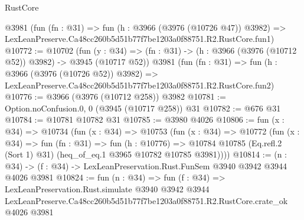 \begin{lexlean}{RustCore}
\begin{coremodule}
    @3981
    (fun (fn : @31) =>
    fun (h : @3966 (@3976 (@10726 @47)) @3982) =>
    LexLeanPreserve.Ca48cc260b5d51b77f7be1203a0f88751.R2.RustCore.fun1)
@10772 := @10702
    (fun (y : @34) => (fn : @31) -> (h : @3966 (@3976 (@10712 @52)) @3982) -> @3945 (@10717 @52))
    @3981
    (fun (fn : @31) =>
    fun (h : @3966 (@3976 (@10726 @52)) @3982) =>
    LexLeanPreserve.Ca48cc260b5d51b77f7be1203a0f88751.R2.RustCore.fun2)
@10776 := @3966 (@3976 (@10712 @258)) @3982
@10781 := Option.noConfusion.{0, 0} (@3945 (@10717 @258)) @31
@10782 := @676 @31
@10784 := @10781 @10782 @31
@10785 := @3980 @4026
@10806 := fun (x : @34) =>
  @10734
    (fun (x : @34) =>
    @10753
      (fun (x : @34) =>
      @10772
        (fun (x : @34) =>
        fun (fn : @31) =>
        fun (h : @10776) =>
        @10784 @10785 (Eq.refl.{2} (Sort 1) @31) (heq_of_eq.{1} @3965 @10782 @10785 @3981))))
@10814 := (n : @34) -> (f : @34) -> LexLeanPreservation.Rust.FunSem @3940 @3942 @3944 @4026 @3981
@10824 := fun (n : @34) =>
  fun (f : @34) =>
  LexLeanPreservation.Rust.simulate
    @3940
    @3942
    @3944
    LexLeanPreserve.Ca48cc260b5d51b77f7be1203a0f88751.R2.RustCore.crate_ok
    @4026
    @3981
\end{coremodule}
\end{lexlean}
